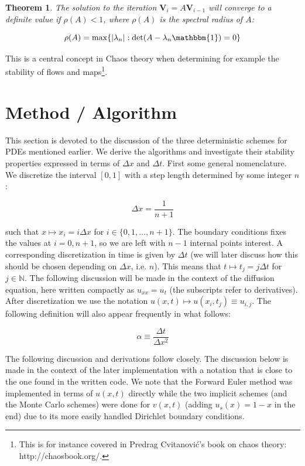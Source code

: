 \documentclass[a4paper, 11pt, notitlepage,english]{article}
\newcommand{\id}{\mathbbm{1}}
\newtheorem{theorem}{Theorem}
\begin{document}
\begin{theorem}
The solution to the iteration $\boldsymbol{V}_i = A \boldsymbol{V}_{i-1}$ will converge to a definite value if $\rho(A) < 1$, where $\rho(A)$ is the spectral radius of $A$:

\begin{equation}
\rho(A) = \mathrm{max}\{\lvert \lambda_n \rvert : \mathrm{det}(A-\lambda_n\id)=0 \}
\label{eq:Spectral_radius}
\end{equation}
\end{theorem}

This is a central concept in Chaos theory when determining for example the stability of flows and maps\footnote{This is for instance covered in Predrag Cvitanović's book on chaos theory: http://chaosbook.org/.}.

\section{Method / Algorithm}
This section is devoted to the discussion of the three deterministic schemes for PDEs mentioned earlier. We derive the algorithms and investigate their stability properties expressed in terms of $\Delta x$ and $\Delta t$. First some general nomenclature. We discretize the interval $[0,1]$ with a step length determined by some integer $n$: 

\begin{equation}
 \Delta x = \frac{1}{n+1}
\label{eq:Step_length}
\end{equation}

such that $x \mapsto x_i = i\Delta x$ for $i \in \{0,1,\dots,n+1 \}$. The boundary conditions fixes the values at $i=0,n+1$, so we are left with $n-1$ internal points interest. A corresponding discretization in time is given by $\Delta t$ (we will later discuss how this should be chosen depending on $\Delta x$, i.e. $n$). This means that $t\mapsto t_j = j\Delta t$ for $j\in \mathbb{N}$. The following discussion will be made in the context of the diffusion equation, here written compactly as $u_{xx} = u_t$ (the subscripts refer to derivatives). After discretization we use the notation $u(x,t) \mapsto u(x_i, t_j) \equiv u_{i,j}$. The following definition will also appear frequently in what follows:

\begin{equation}
 \alpha \equiv \frac{\Delta t}{\Delta x^2}
\label{eq:Step_parameter}
\end{equation}

The following discussion and derivations follow \cite{Komp3150} closely. The discussion below is made in the context of the later implementation with a notation that is close to the one found in the written code. We note that the Forward Euler method was implemented in terms of $u(x,t)$ directly while the two implicit schemes (and the Monte Carlo schemes) were done for $v(x,t)$ (adding $u_s(x) = 1-x$ in the end) due to its more easily handled Dirichlet boundary conditions. \\
\end{document}
